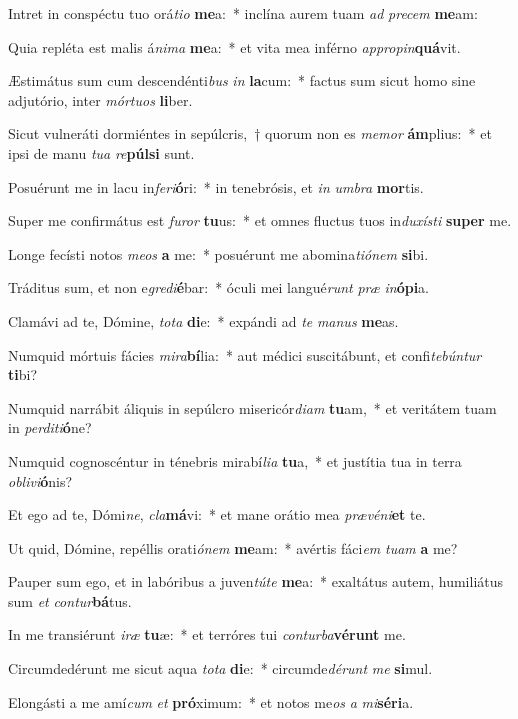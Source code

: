 \item Intret in conspéctu tuo orá\textit{ti}\textit{o} \textbf{me}a:~* inclína aurem tuam \textit{ad} \textit{pre}\textit{cem} \textbf{me}am:
\item Quia repléta est malis á\textit{ni}\textit{ma} \textbf{me}a:~* et vita mea inférno \textit{ap}\textit{pro}\textit{pin}\textbf{quá}vit.
\item Æstimátus sum cum descendénti\textit{bus} \textit{in} \textbf{la}cum:~* factus sum sicut homo sine adjutório, inter \textit{mór}\textit{tu}\textit{os} \textbf{li}ber.
\item Sicut vulneráti dormiéntes in sepúlcris,~† quorum non es \textit{me}\textit{mor} \textbf{ám}plius:~* et ipsi de manu \textit{tu}\textit{a} \textit{re}\textbf{púl}\textbf{si} sunt.
\item Posuérunt me in lacu in\textit{fe}\textit{ri}\textbf{ó}ri:~* in tenebrósis, et \textit{in} \textit{um}\textit{bra} \textbf{mor}tis.
\item Super me confirmátus est \textit{fu}\textit{ror} \textbf{tu}us:~* et omnes fluctus tuos in\textit{du}\textit{xís}\textit{ti} \textbf{su}\textbf{per} me.
\item Longe fecísti notos \textit{me}\textit{os} \textbf{a} me:~* posuérunt me abomina\textit{ti}\textit{ó}\textit{nem} \textbf{si}bi.
\item Tráditus sum, et non e\textit{gre}\textit{di}\textbf{é}bar:~* óculi mei langué\textit{runt} \textit{præ} \textit{in}\textbf{ó}\textbf{pi}a.
\item Clamávi ad te, Dómine, \textit{to}\textit{ta} \textbf{di}e:~* expándi ad \textit{te} \textit{ma}\textit{nus} \textbf{me}as.
\item Numquid mórtuis fácies \textit{mi}\textit{ra}\textbf{bí}lia:~* aut médici suscitábunt, et confi\textit{te}\textit{bún}\textit{tur} \textbf{ti}bi?
\item Numquid narrábit áliquis in sepúlcro misericór\textit{di}\textit{am} \textbf{tu}am,~* et veritátem tuam in \textit{per}\textit{di}\textit{ti}\textbf{ó}ne?
\item Numquid cognoscéntur in ténebris mirabí\textit{li}\textit{a} \textbf{tu}a,~* et justítia tua in terra \textit{ob}\textit{li}\textit{vi}\textbf{ó}nis?
\item Et ego ad te, Dómi\textit{ne}, \textit{cla}\textbf{má}vi:~* et mane orátio mea \textit{præ}\textit{vé}\textit{ni}\textbf{et} te.
\item Ut quid, Dómine, repéllis orati\textit{ó}\textit{nem} \textbf{me}am:~* avértis fáci\textit{em} \textit{tu}\textit{am} \textbf{a} me?
\item Pauper sum ego, et in labóribus a juven\textit{tú}\textit{te} \textbf{me}a:~* exaltátus autem, humiliátus sum \textit{et} \textit{con}\textit{tur}\textbf{bá}tus.
\item In me transiérunt \textit{i}\textit{ræ} \textbf{tu}æ:~* et terróres tui \textit{con}\textit{tur}\textit{ba}\textbf{vé}\textbf{runt} me.
\item Circumdedérunt me sicut aqua \textit{to}\textit{ta} \textbf{di}e:~* circumde\textit{dé}\textit{runt} \textit{me} \textbf{si}mul.
\item Elongásti a me amí\textit{cum} \textit{et} \textbf{pró}ximum:~* et notos me\textit{os} \textit{a} \textit{mi}\textbf{sé}\textbf{ri}a.
